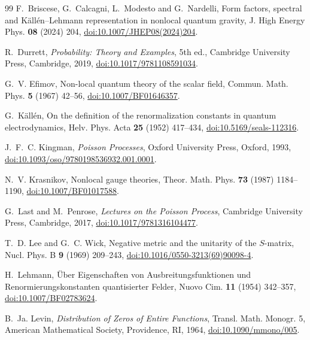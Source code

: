 \documentclass[aps,prd,twocolumn,superscriptaddress,nofootinbib,longbibliography,floatfix,amsmath,amssymb,10pt]{revtex4-2}
\theoremstyle{definition}
\theoremstyle{remark}
\begin{document}
\begin{thebibliography}{99}
F.~Briscese, G.~Calcagni, L.~Modesto and G.~Nardelli, Form factors, spectral
and K\"all\'en--Lehmann representation in nonlocal quantum gravity, J. High
Energy Phys. \textbf{08} (2024) 204,
\href{https://doi.org/10.1007/JHEP08(2024)204}{doi:10.1007/JHEP08(2024)204}.

R.~Durrett, \emph{Probability: Theory and Examples}, 5th ed., Cambridge
University Press, Cambridge, 2019,
\href{https://doi.org/10.1017/9781108591034}{doi:10.1017/9781108591034}.

G.~V. Efimov, Non-local quantum theory of the scalar field, Commun. Math.
Phys. \textbf{5} (1967) 42--56,
\href{https://doi.org/10.1007/BF01646357}{doi:10.1007/BF01646357}.

G.~K\"all\'en, On the definition of the renormalization constants in quantum
electrodynamics, Helv. Phys. Acta \textbf{25} (1952) 417--434,
\href{https://doi.org/10.5169/seals-112316}{doi:10.5169/seals-112316}.

J.~F.~C. Kingman, \emph{Poisson Processes}, Oxford University Press, Oxford,
1993, \href{https://doi.org/10.1093/oso/9780198536932.001.0001}{doi:10.1093/oso/9780198536932.001.0001}.

N.~V. Krasnikov, Nonlocal gauge theories, Theor. Math. Phys. \textbf{73}
(1987) 1184--1190,
\href{https://doi.org/10.1007/BF01017588}{doi:10.1007/BF01017588}.

G.~Last and M.~Penrose, \emph{Lectures on the Poisson Process}, Cambridge
University Press, Cambridge, 2017,
\href{https://doi.org/10.1017/9781316104477}{doi:10.1017/9781316104477}.

T.~D. Lee and G.~C. Wick, Negative metric and the unitarity of the
$S$-matrix, Nucl. Phys. B \textbf{9} (1969) 209--243,
\href{https://doi.org/10.1016/0550-3213(69)90098-4}{doi:10.1016/0550-3213(69)90098-4}.

H.~Lehmann, \"Uber Eigenschaften von Ausbreitungsfunktionen und
Renormierungskonstanten quantisierter Felder, Nuovo Cim. \textbf{11} (1954)
342--357, \href{https://doi.org/10.1007/BF02783624}{doi:10.1007/BF02783624}.

B.~Ja. Levin, \emph{Distribution of Zeros of Entire Functions}, Transl. Math.
Monogr. 5, American Mathematical Society, Providence, RI, 1964,
\href{https://doi.org/10.1090/mmono/005}{doi:10.1090/mmono/005}.


\end{thebibliography}
\end{document}
